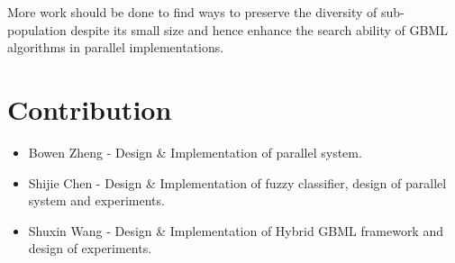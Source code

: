 \documentclass[conference]{IEEEtran}
\begin{document}
 More work should be done to find ways to preserve the diversity of sub-population despite its small size and hence enhance the search ability of GBML algorithms in parallel implementations.


  \section{Contribution}
  
    \begin{itemize}
    \item Bowen Zheng - Design \& Implementation of parallel system.
    \item Shijie Chen - Design \& Implementation of fuzzy classifier, design of parallel system and experiments.
    \item Shuxin Wang - Design \& Implementation of Hybrid GBML framework and design of experiments.
    \end{itemize}



\end{document}

